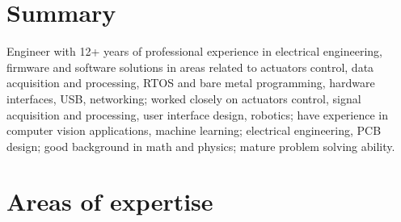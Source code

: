 \vspace*{-15mm}

\section{Summary}


Engineer with 12+ years of professional experience in electrical engineering, firmware and software solutions in areas related to actuators control, data acquisition and processing, RTOS and bare metal programming, hardware interfaces, USB, networking; worked closely on actuators control, signal acquisition and processing, user interface design, robotics; have experience in computer vision applications, machine learning; electrical engineering, PCB design; good background in math and physics; mature problem solving ability.

\vspace*{-4mm}
\section{Areas of expertise}


